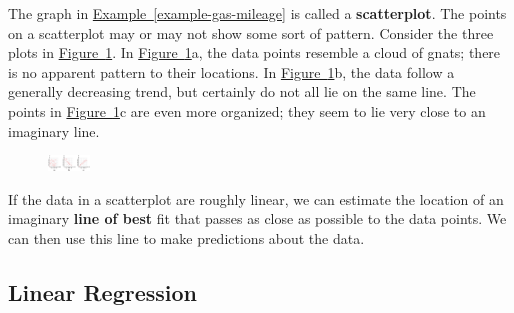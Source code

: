 \documentclass[10pt,]{book}
\newcommand{\terminology}[1]{\textbf{#1}}
\theoremstyle{plain}
\theoremstyle{definition}
\theoremstyle{definition}
\numberwithin{equation}{section}
\begin{document}
    The graph in \hyperref[example-gas-mileage]{Example~\ref{example-gas-mileage}} is called a \terminology{scatterplot}. The points on a scatterplot may or may not show some sort of pattern. Consider the three plots in \hyperref[fig-scatterplots]{Figure~\ref{fig-scatterplots}}. In \hyperref[fig-scatterplots]{Figure~\ref{fig-scatterplots}}a, the data points resemble a cloud of gnats; there is no apparent pattern to their locations. In \hyperref[fig-scatterplots]{Figure~\ref{fig-scatterplots}}b, the data follow a generally decreasing trend, but certainly do not all lie on the same line. The points in \hyperref[fig-scatterplots]{Figure~\ref{fig-scatterplots}}c are even more organized; they seem to lie very close to an imaginary line.
%
\leavevmode%
\begin{figure}
\centering
\includegraphics[width=0.100\textwidth,]{images/fig-scatterplots.svg}\caption{\label{fig-scatterplots}}
\end{figure}
\par

    If the data in a scatterplot are roughly linear, we can estimate the location of an imaginary \terminology{line of best} fit that passes as close as possible to the data points. We can then use this line to make predictions about the data.%
\typeout{************************************************}
\typeout{************************************************}
\subsection[Linear Regression]{Linear Regression}\label{subsection-30}
\end{document}
